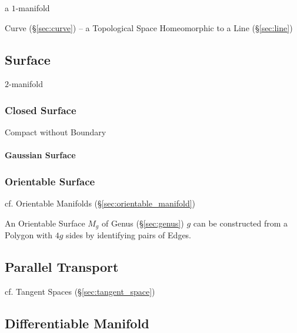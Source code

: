 a $1$-manifold

\fist Curve (\S\ref{sec:curve}) -- a Topological Space Homeomorphic to a Line
(\S\ref{sec:line})



\subsection{Surface}\label{sec:surface}

$2$-manifold



\subsubsection{Closed Surface}\label{sec:closed_surface}

Compact without Boundary



\paragraph{Gaussian Surface}\label{sec:gaussian_surface}\hfill



\subsubsection{Orientable Surface}\label{sec:orientable_surface}

cf. Orientable Manifolds (\S\ref{sec:orientable_manifold})

An Orientable Surface $M_g$ of Genus (\S\ref{sec:genus}) $g$ can
be constructed from a Polygon with $4g$ sides by identifying pairs of Edges.



\subsection{Parallel Transport}\label{sec:parallel_transport}

\fist cf. Tangent Spaces (\S\ref{sec:tangent_space})



\subsection{Differentiable Manifold}\label{sec:differentiable_manifold}

